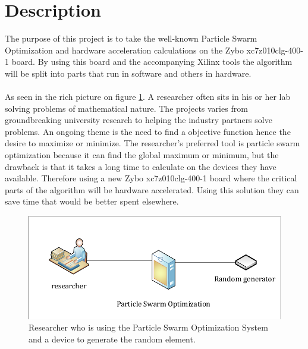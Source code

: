 \section{Description}\label{sc:problemdescription}
The purpose of this project is to take the well-known Particle Swarm Optimization \cite{Blondin2009} and hardware acceleration calculations on the Zybo xc7z010clg-400-1 board. By using this board and the accompanying Xilinx tools the algorithm will be split into parts that run in software and others in hardware. 
\\\\
As seen in the rich picture on figure \ref{fig:descriptiondiagram}. A researcher often sits in his or her lab solving problems of mathematical nature. The projects varies from groundbreaking university research to helping the industry partners solve problems. An ongoing theme is the need to find a objective function hence the desire to maximize or minimize.
The researcher's preferred tool is particle swarm optimization because it can find the global maximum or minimum, but the drawback is that it takes a long time to calculate on the devices they have available. Therefore using a new Zybo xc7z010clg-400-1 board where the critical parts of the algorithm will be hardware accelerated. Using this solution they can save time that would be better spent elsewhere.

\begin{figure}[!h]
	\centering
	\includegraphics[width=0.7\linewidth]{diagram/description_diagram}
	\caption{Researcher who is using the Particle Swarm Optimization System and a device to generate the random element.}
	\label{fig:descriptiondiagram}
\end{figure}